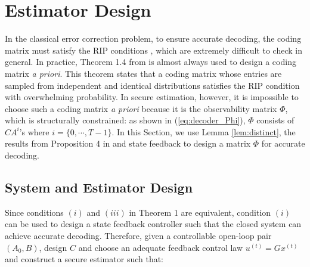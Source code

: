 \documentclass[../../thesis.tex]{subfiles}
\begin{document}
\section{Estimator Design}\label{sec:design}

In the classical error correction problem, to ensure accurate decoding, the coding matrix must satisfy the RIP conditions  \cite{Candes_Tao}, which are extremely difficult to check in general. In practice, Theorem 1.4 from\cite{Candes_Tao} is almost always used to design a coding matrix {\it a priori}. This theorem states that a coding matrix whose entries are sampled from independent and identical distributions satisfies the RIP condition with overwhelming probability. 
In secure estimation, however, it is impossible to choose such a coding matrix {\it a priori} because it is the observability matrix $\Phi$, which is structurally constrained: as shown in (\ref{eq:decoder_Phi}), $\Phi$ consists of $CA^{i}$'s where $i=\{0, \cdots, T-1\}$. In this Section, we use Lemma \ref{lem:distinct}, the results from Proposition 4 in \cite{Fawzi2014} and state feedback to design a matrix $\Phi$ for accurate decoding. 
\subsection{System and Estimator Design}\label{sec:decoder_design}

Since conditions $(i)$ and $(iii)$ in Theorem 1 are equivalent, condition $(i)$ can be used to design a state feedback controller such that the closed system can achieve accurate decoding. Therefore, given a controllable open-loop pair $(A_0,B)$, design $C$ and choose an adequate feedback control law $u^{(t)} = G x^{(t)}$ and construct a secure estimator such that:
\end{document}
